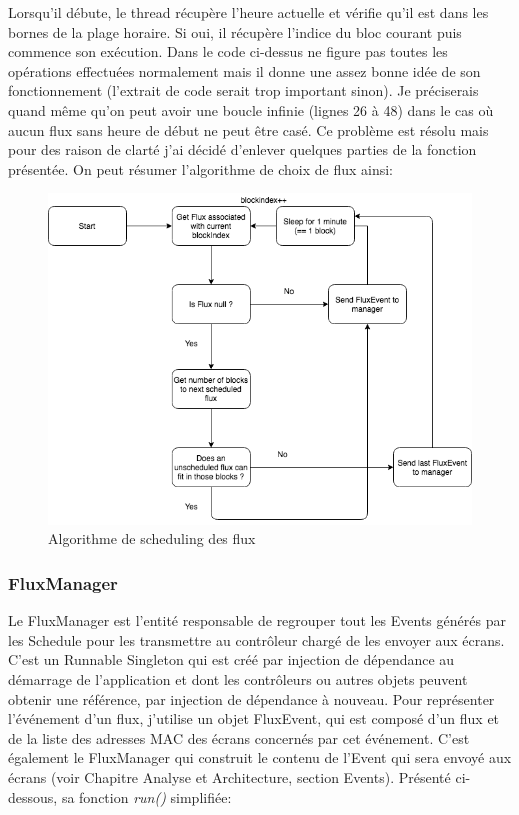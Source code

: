 \documentclass[french]{article}
\begin{document}


Lorsqu'il débute, le thread récupère l'heure actuelle et vérifie qu'il est dans les bornes de la plage horaire. Si oui, il récupère l'indice du bloc courant puis commence son exécution. Dans le code ci-dessus ne figure pas toutes les opérations effectuées normalement mais il donne une assez bonne idée de son fonctionnement (l'extrait de code serait trop important sinon). Je préciserais quand même qu'on peut avoir une boucle infinie (lignes 26 à 48) dans le cas où aucun flux sans heure de début ne peut être casé. Ce problème est résolu mais pour des raison de clarté j'ai décidé d'enlever quelques parties de la fonction présentée. \newline
On peut résumer l'algorithme de choix de flux ainsi:


\begin{figure}[h]
	\centering	
	\includegraphics[width=0.8\linewidth]{schemas/runningschedulethread_algo.png}%
	\caption{Algorithme de scheduling des flux}
\end{figure}



\newpage
\subsubsection{FluxManager}

Le FluxManager est l'entité responsable de regrouper tout les Events générés par les Schedule pour les transmettre au contrôleur chargé de les envoyer aux écrans. C'est un Runnable Singleton qui est créé par injection de dépendance au démarrage de l'application et dont les contrôleurs ou autres objets peuvent obtenir une référence, par injection de dépendance à nouveau.
Pour représenter l'événement d'un flux, j'utilise un objet FluxEvent, qui est composé d'un flux et de la liste des adresses MAC des écrans concernés par cet événement. \newline
C'est également le FluxManager qui construit le contenu de l'Event qui sera envoyé aux écrans (voir Chapitre Analyse et Architecture, section Events).
Présenté ci-dessous, sa fonction \textit{run()} simplifiée:
\end{document}
